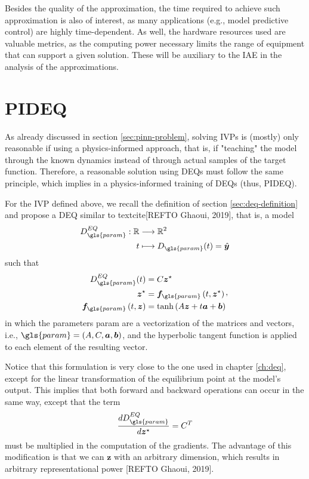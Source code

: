 Besides the quality of the approximation, the time required to achieve such approximation is also of interest, as many applications (e.g., model predictive control) are highly time-dependent.
As well, the hardware resources used are valuable metrics, as the computing power necessary limits the range of equipment that can support a given solution.
These will be auxiliary to the \gls{IAE} in the analysis of the approximations.

\section{PIDEQ}

As already discussed in section \ref{sec:pinn-problem}, solving \gls{IVP}s is (mostly) only reasonable if using a physics-informed approach, that is, if "teaching" the model through the known dynamics instead of through actual samples of the target function.
Therefore, a reasonable solution using \gls{DEQ}s must follow the same principle, which implies in a physics-informed training of \gls{DEQ}s (thus, \gls{PIDEQ}).

For the \gls{IVP} defined above, we recall the definition of section \ref{sec:deq-definition} and propose a \gls{DEQ} similar to textcite[REFTO Ghaoui, 2019], that is, a model
\begin{align*}
    D_{\gls{param}}^{EQ}: \R &\longrightarrow \R^2 \\
    t &\longmapsto D_{\gls{param}}(t) = \hat{\bm{y}}
\end{align*}
such that
\begin{equation}
\begin{split}
    D^{EQ}_{\gls{param}}(t) &= C\bm{z}^{\star} \\
    \bm{z}^{\star} &= \bm{f}_{\gls{param}}\left( t,\bm{z}^{\star} \right) \\
    \bm{f}_{\gls{param}}\left( t,\bm{z} \right) &= \tanh \left( A\bm{z} + t\bm{a} + \bm{b} \right)
\end{split}
,\end{equation}
in which the parameters \gls{param} are a vectorization of the matrices and vectors, i.e., $\gls{param} = \left( A,C,\bm{a},\bm{b} \right)$, and the hyperbolic tangent function is applied to each element of the resulting vector.

Notice that this formulation is very close to the one used in chapter \ref{ch:deq}, except for the linear transformation of the equilibrium point at the model's output.
This implies that both forward and backward operations can occur in the same way, except that the term  \[
    \frac{d D^{EQ}_{\gls{param}}}{d \bm{z}^{\star}} = C^T
\] must be multiplied in the computation of the gradients.
The advantage of this modification is that we can $\bm{z}$ with an arbitrary dimension, which results in arbitrary representational power [REFTO Ghaoui, 2019].

